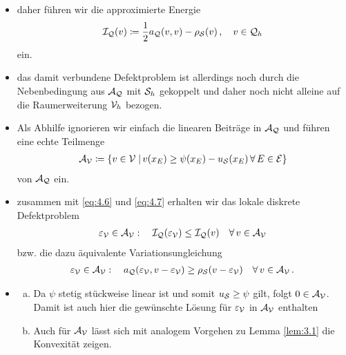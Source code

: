 \begin{itemize}
\begin{proof}
Die Aussage folgt aus Theorem 4.1 bzw. Bemerkung 4.3 in \cite{HoppeKorn} zusammen mit dem Lemma auf Seite 14 in \cite{Deufl}.
\end{proof}

\item daher führen wir die approximierte Energie
\begin{align}\label{eq:4.6}
	\mathcal I_{\mathcal Q} (v) \coloneqq \frac 1 2 a_{\mathcal Q}(v,v)-\rho_{\mathcal S}(v) \, , \quad v \in \mathcal Q_h 
\end{align}
ein.

\item das damit verbundene Defektproblem ist allerdings noch durch die Nebenbedingung aus $\mathcal A_{\mathcal Q}$ mit $\mathcal S_h$ gekoppelt und daher noch nicht alleine auf die Raumerweiterung $\mathcal V_h$ bezogen.

\item Als Abhilfe ignorieren wir einfach die linearen Beiträge in $\mathcal A_{\mathcal Q}$ und führen eine echte Teilmenge 
\begin{align}\label{eq:4.7}
	\mathcal A_{\mathcal V} \coloneqq \{v \in \mathcal V \;\vert\, v(x_E) \ge \psi(x_E)-u_{\mathcal S}(x_E) \, \forall \, E \in \mathcal E\}
\end{align}
von $\mathcal A_{\mathcal Q}$ ein.

\item zusammen mit \eqref{eq:4.6} und \eqref{eq:4.7} erhalten wir das lokale diskrete Defektproblem
\begin{align}\label{eq:4.8}
	\varepsilon_{\mathcal V} \in \mathcal A_{\mathcal V} : \quad \mathcal I_{\mathcal Q}(\varepsilon_{\mathcal V}) \le \mathcal I_{\mathcal Q} (v) \quad \forall \, v \in \mathcal A_{\mathcal V}
\end{align}
bzw. die dazu äquivalente Variationsungleichung
\begin{align}\label{eq:4.9}
	\varepsilon_{\mathcal V} \in \mathcal A_{\mathcal V} : \quad a_{\mathcal Q} (\varepsilon_{\mathcal V},v-\varepsilon_{\mathcal V})\ge \rho_{\mathcal S} (v-\varepsilon_{\mathcal V}) \quad \forall \, v \in \mathcal A_{\mathcal V} \, .
\end{align}

\item
\begin{bem}
\begin{enumerate}[(a)]
\item Da $\psi$ stetig stückweise linear ist und somit $u_{\mathcal S} \ge \psi$ gilt, folgt $0 \in \mathcal A_{\mathcal V}$. Damit ist auch hier die gewünschte Lösung für $\varepsilon_{\mathcal V}$ in $\mathcal A_{\mathcal V}$ enthalten
\item	Auch für $\mathcal A_{\mathcal V}$ lässt sich mit analogem Vorgehen zu Lemma \ref{lem:3.1} die Konvexität zeigen.
\end{enumerate}
\end{bem}


\end{itemize}
